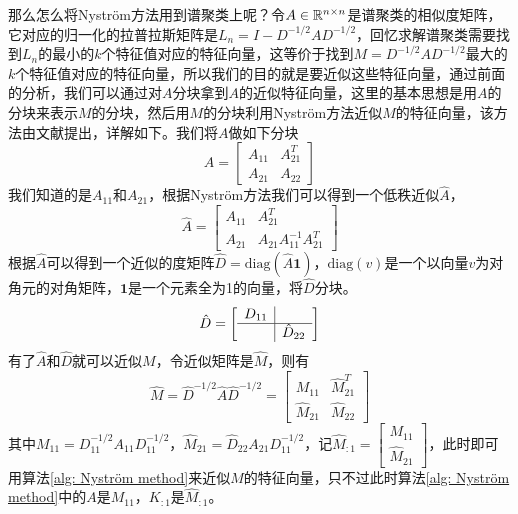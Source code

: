 那么怎么将Nyström方法用到谱聚类上呢？令$A \in \mathbb{R}^{n \times n}$是谱聚类的相似度矩阵，它对应的归一化的拉普拉斯矩阵是$L_n = I - D^{-1/2}AD^{-1/2}$，回忆求解谱聚类需要找到$L_n$的最小的$k$个特征值对应的特征向量，这等价于找到$M = D^{-1/2}AD^{-1/2}$最大的$k$个特征值对应的特征向量，所以我们的目的就是要近似这些特征向量，通过前面的分析，我们可以通过对$A$分块拿到$A$的近似特征向量，这里的基本思想是用$A$的分块来表示$M$的分块，然后用$M$的分块利用Nyström方法近似$M$的特征向量，该方法由文献\cite{fowlkes2004spectral}提出，详解如下。我们将$A$做如下分块
\begin{equation}
    A = \left[\begin{array}{c|c}
        A_{11} & A_{21}^T \\
      \hline
      A_{21} & A_{22}
    \end{array}\right]
\end{equation}
我们知道的是$A_{11}$和$A_{21}$，根据Nyström方法我们可以得到一个低秩近似$\hat{A}$，
\begin{equation}
    \hat{A} = \left[\begin{array}{c|c}
        A_{11} & A_{21}^T \\
      \hline
      A_{21} & A_{21}A_{11}^{-1}A_{21}^T
    \end{array}\right]
\end{equation}
根据$\hat{A}$可以得到一个近似的度矩阵$\hat{D} = \text{diag}(\hat{A}\mathbf{1})$，$\text{diag}(v)$是一个以向量$v$为对角元的对角矩阵，$\mathbf{1}$是一个元素全为1的向量，将$\hat{D}$分块。
\begin{equation}
    \hat{D} = \left[\begin{array}{c|c}
        D_{11} &  \\
      \hline
      & \hat{D}_{22}
    \end{array}\right]
\end{equation}
有了$\hat{A}$和$\hat{D}$就可以近似$M$，令近似矩阵是$\hat{M}$，则有
\begin{equation}
    \hat{M} = \hat{D}^{-1/2}\hat{A}\hat{D}^{-1/2} = \left[\begin{array}{c|c}
        M_{11} & \hat{M}_{21}^T \\
      \hline
      \hat{M}_{21} & \hat{M}_{22}
    \end{array}\right]
\end{equation}
其中$M_{11} = D_{11}^{-1/2}A_{11}D_{11}^{-1/2}$，$\hat{M}_{21} = \hat{D}_{22}A_{21}D_{11}^{-1/2}$，记$\hat{M}_{:1} = \begin{bmatrix}
    M_{11} \\
    \hat{M}_{21}
\end{bmatrix}$，此时即可用算法\ref{alg: Nyström method}来近似$M$的特征向量，只不过此时算法\ref{alg: Nyström method}中的$A$是$M_{11}$，$K_{:1}$是$\hat{M}_{:1}$。

